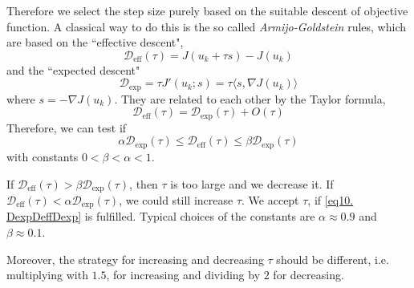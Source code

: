 Therefore we select the step size purely based on the suitable descent of objective function. A classical way to do this is the so called \textit{Armijo-Goldstein} rules, which are based on the ``effective descent",
\[
\mathcal{D}_{\text{eff}}(\tau) = J(u_k+\tau s)-J(u_k)
\]
and the ``expected descent"
\[
	\mathcal{D}_{\text{exp}} = \tau J'(u_k;s)=\tau \langle s, \nabla J(u_k)\rangle
\]
where  $s=-\nabla J(u_k)$. They are related to each other by the Taylor formula,
\[
	\mathcal{D}_{\text{eff}}(\tau)=\mathcal{D}_{\text{exp}}(\tau)+O(\tau)
\]
Therefore, we can test if 
\begin{equation}
\alpha \mathcal{D}_{\text{exp}}(\tau)\leq \mathcal{D}_{\text{eff}}(\tau) \leq \beta \mathcal{D}_{\text{exp}}(\tau) \label{eq10. DexpDeffDexp} \tag{*}
\end{equation}
with constants $0<\beta<\alpha<1$. 

If $\mathcal{D}_{\text{eff}}(\tau) > \beta \mathcal{D}_{\text{exp}}(\tau)$, then $\tau$ is too large and we decrease it. 
If $\mathcal{D}_{\text{eff}}(\tau)<\alpha\mathcal{D}_{\text{exp}}(\tau)$, we could still increase $\tau$. We accept $\tau$, if 
\eqref{eq10. DexpDeffDexp} is fulfilled. Typical choices of the constants are $\alpha \approx 0.9$ and $\beta \approx 0.1$.

Moreover, the strategy for increasing and decreasing $\tau$ should be different, i.e. multiplying with $1.5$, for increasing and dividing by $2$ for decreasing.

